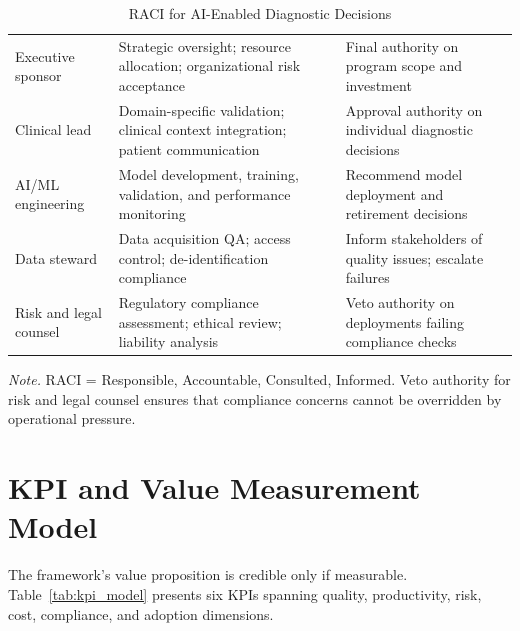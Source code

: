 \begin{table}[H]
\tablestripes
\begin{tabularx}{\textwidth}{L L L}
\toprule
{} &  &  \\
\midrule
Executive sponsor & Strategic oversight; resource allocation; organizational risk acceptance & Final authority on program scope and investment \\
\addlinespace
Clinical lead & Domain-specific validation; clinical context integration; patient communication & Approval authority on individual diagnostic decisions \\
\addlinespace
AI/ML engineering & Model development, training, validation, and performance monitoring & Recommend model deployment and retirement decisions \\
\addlinespace
Data steward & Data acquisition QA; access control; de-identification compliance & Inform stakeholders of quality issues; escalate failures \\
\addlinespace
Risk and legal counsel & Regulatory compliance assessment; ethical review; liability analysis & Veto authority on deployments failing compliance checks \\
\bottomrule
\end{tabularx}
\caption{RACI for AI-Enabled Diagnostic Decisions}
\label{tab:raci}
\vspace{0.5em}\noindent\textit{Note.} RACI = Responsible, Accountable, Consulted, Informed. Veto authority for risk and legal counsel ensures that compliance concerns cannot be overridden by operational pressure.
\end{table}

\section{KPI and Value Measurement Model}
\label{sec:fw_kpi}

The framework's value proposition is credible only if measurable. Table~\ref{tab:kpi_model} presents six KPIs spanning quality, productivity, risk, cost, compliance, and adoption dimensions.

